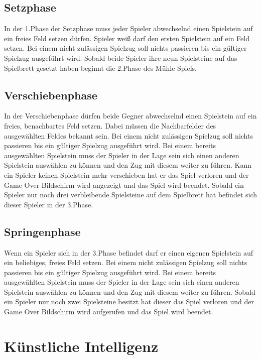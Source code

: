 \documentclass[oneside]{ausarbeitung}
\begin{document}
\subsection{Setzphase}

In der 1.Phase der Setzphase muss jeder Spieler abwechselnd einen Spielstein auf ein freies Feld setzen dürfen. Spieler weiß darf den ersten Spielstein auf ein Feld setzen. Bei einem nicht zulässigen Spielzug soll nichts passieren bis ein gültiger Spielzug ausgeführt wird. Sobald beide Spieler ihre neun Spielsteine auf das Spielbrett gesetzt haben beginnt die 2.Phase des Mühle Spiels.

\subsection{Verschiebenphase}

In der Verschiebenphase dürfen beide Gegner abwechselnd einen Spielstein auf ein freies, benachbartes Feld setzen. Dabei müssen die Nachbarfelder des ausgewählten Feldes bekannt sein. Bei einem nicht zulässigen Spielzug soll nichts passieren bis ein gültiger Spielzug ausgeführt wird. Bei einem bereits ausgewählten Spielstein muss der Spieler in der Lage sein sich einen anderen Spielstein auswählen zu können und den Zug mit diesem weiter zu führen. Kann ein Spieler keinen Spielstein mehr verschieben hat er das Spiel verloren und der Game Over Bildschirm wird angezeigt und das Spiel wird beendet. Sobald ein Spieler nur noch drei verbleibende Spielsteine auf dem Spielbrett hat befindet sich dieser Spieler in der 3.Phase.

\subsection{Springenphase}

Wenn ein Spieler sich in der 3.Phase befindet darf er einen eigenen Spielstein auf ein beliebiges, freies Feld setzen. Bei einem nicht zulässigen Spielzug soll nichts passieren bis ein gültiger Spielzug ausgeführt wird. Bei einem bereits ausgewählten Spielstein muss der Spieler in der Lage sein sich einen anderen Spielstein auswählen zu können und den Zug mit diesem weiter zu führen. Sobald ein Spieler nur noch zwei Spielsteine besitzt hat dieser das Spiel verloren und der Game Over Bildschirm wird aufgerufen und das Spiel wird beendet.

\section{Künstliche Intelligenz}
\end{document}

